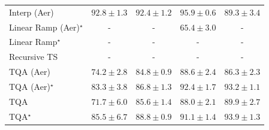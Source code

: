\begin{tabular}{l|cccc|}
Interp (Aer) & {\cellcolor[HTML]{9E3604}} \color[HTML]{F1F1F1} $92.8\pm 1.3$ & {\cellcolor[HTML]{A33904}} \color[HTML]{F1F1F1} $92.4\pm 1.2$ & {\cellcolor[HTML]{762A05}} \color[HTML]{F1F1F1} $95.9\pm 0.6$ & {\cellcolor[HTML]{CB4B02}} \color[HTML]{F1F1F1} $89.3\pm 3.4$ \\
Linear Ramp (Aer)$^\star$ & {\cellcolor[HTML]{000000}} \color[HTML]{F1F1F1} {\cellcolor{white}} \color{black} - & {\cellcolor[HTML]{000000}} \color[HTML]{F1F1F1} {\cellcolor{white}} \color{black} - & {\cellcolor[HTML]{FFFFE5}} \color[HTML]{000000} $65.4\pm 3.0$ & {\cellcolor[HTML]{000000}} \color[HTML]{F1F1F1} {\cellcolor{white}} \color{black} - \\
Linear Ramp$^\star$ & {\cellcolor[HTML]{000000}} \color[HTML]{F1F1F1} {\cellcolor{white}} \color{black} - & {\cellcolor[HTML]{000000}} \color[HTML]{F1F1F1} {\cellcolor{white}} \color{black} - & {\cellcolor[HTML]{000000}} \color[HTML]{F1F1F1} {\cellcolor{white}} \color{black} - & {\cellcolor[HTML]{000000}} \color[HTML]{F1F1F1} {\cellcolor{white}} \color{black} - \\
Recursive TS & {\cellcolor[HTML]{000000}} \color[HTML]{F1F1F1} {\cellcolor{white}} \color{black} - & {\cellcolor[HTML]{000000}} \color[HTML]{F1F1F1} {\cellcolor{white}} \color{black} - & {\cellcolor[HTML]{000000}} \color[HTML]{F1F1F1} {\cellcolor{white}} \color{black} - & {\cellcolor[HTML]{000000}} \color[HTML]{F1F1F1} {\cellcolor{white}} \color{black} - \\
TQA (Aer) & {\cellcolor[HTML]{FEDD84}} \color[HTML]{000000} $74.2\pm 2.8$ & {\cellcolor[HTML]{EE7416}} \color[HTML]{F1F1F1} $84.8\pm 0.9$ & {\cellcolor[HTML]{D15205}} \color[HTML]{F1F1F1} $88.6\pm 2.4$ & {\cellcolor[HTML]{E3660F}} \color[HTML]{F1F1F1} $86.3\pm 2.3$ \\
TQA (Aer)$^\star$ & {\cellcolor[HTML]{F5841E}} \color[HTML]{F1F1F1} $83.3\pm 3.8$ & {\cellcolor[HTML]{DF620D}} \color[HTML]{F1F1F1} $86.8\pm 1.3$ & {\cellcolor[HTML]{A33904}} \color[HTML]{F1F1F1} $92.4\pm 1.7$ & {\cellcolor[HTML]{993404}} \color[HTML]{F1F1F1} $93.2\pm 1.1$ \\
TQA & {\cellcolor[HTML]{FEECA4}} \color[HTML]{000000} $71.7\pm 6.0$ & {\cellcolor[HTML]{E96D13}} \color[HTML]{F1F1F1} $85.6\pm 1.4$ & {\cellcolor[HTML]{D65808}} \color[HTML]{F1F1F1} $88.0\pm 2.1$ & {\cellcolor[HTML]{C34802}} \color[HTML]{F1F1F1} $89.9\pm 2.7$ \\
TQA$^\star$ & {\cellcolor[HTML]{EA6E13}} \color[HTML]{F1F1F1} $85.5\pm 6.7$ & {\cellcolor[HTML]{CF5004}} \color[HTML]{F1F1F1} $88.8\pm 0.9$ & {\cellcolor[HTML]{B44103}} \color[HTML]{F1F1F1} $91.1\pm 1.4$ & {\cellcolor[HTML]{903104}} \color[HTML]{F1F1F1} $93.9\pm 1.3$ \\

\end{tabular}
